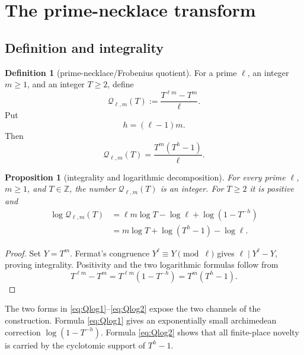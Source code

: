 \documentclass[11pt]{article}
\numberwithin{equation}{section}
\newtheorem{proposition}[theorem]{Proposition}
\theoremstyle{definition}
\newtheorem{definition}[theorem]{Definition}
\theoremstyle{remark}
\newcommand{\Z}{\mathbb Z}
\begin{document}
\section{The prime-necklace transform}

\subsection{Definition and integrality}

\begin{definition}[prime-necklace/Frobenius quotient]\label{def:Q}
For a prime $\ell$, an integer $m\ge1$, and an integer $T\ge2$, define
\begin{equation}\label{eq:Qdef}
  \mathcal Q_{\ell,m}(T)
  :=\frac{T^{\ell m}-T^m}{\ell}.
\end{equation}
Put
\begin{equation}\label{eq:hdef}
  h=(\ell-1)m.
\end{equation}
Then
\begin{equation}\label{eq:Qfactor}
  \mathcal Q_{\ell,m}(T)
  =\frac{T^m(T^h-1)}{\ell}.
\end{equation}
\end{definition}

\begin{proposition}[integrality and logarithmic decomposition]\label{prop:Qintegral}
For every prime $\ell$, $m\ge1$, and $T\in\Z$, the number $\mathcal Q_{\ell,m}(T)$ is an integer.  For $T\ge2$ it is positive and
\begin{align}
  \log\mathcal Q_{\ell,m}(T)
  &=\ell m\log T-\log\ell+\log(1-T^{-h})\label{eq:Qlog1}\\
  &=m\log T+\log(T^h-1)-\log\ell.\label{eq:Qlog2}
\end{align}
\end{proposition}

\begin{proof}
Set $Y=T^m$.  Fermat's congruence $Y^\ell\equiv Y\pmod\ell$ gives $\ell\mid Y^\ell-Y$, proving integrality.  Positivity and the two logarithmic formulas follow from
\[
  T^{\ell m}-T^m=T^{\ell m}(1-T^{-h})=T^m(T^h-1).
\]
\end{proof}

The two forms in \eqref{eq:Qlog1}--\eqref{eq:Qlog2} expose the two channels of the construction.  Formula \eqref{eq:Qlog1} gives an exponentially small archimedean correction $\log(1-T^{-h})$.  Formula \eqref{eq:Qlog2} shows that all finite-place novelty is carried by the cyclotomic support of $T^h-1$.
\end{document}
